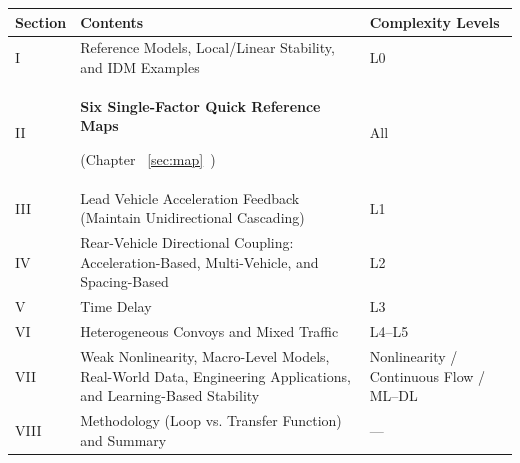 \documentclass[11pt,a4paper,openany]{book}
\numberwithin{equation}{chapter}
\numberwithin{figure}{chapter}
\numberwithin{table}{chapter}
\begin{document}
\begin{center}
\small
{}
\label{tab:book-roadmap}
\begin{tabular}{p{2.0cm}p{5.2cm}p{6.6cm}}
\toprule
\textbf{Section} & \textbf{Contents} & \textbf{Complexity Levels} \\
\midrule
I &




Reference Models, Local/Linear Stability, and IDM Examples




& L0 \\
II & \textbf{Six Single-Factor Quick Reference Maps}




(Chapter ~\ref{sec:map}~)& All



\\
III &




Lead Vehicle Acceleration Feedback (Maintain Unidirectional Cascading)




& L1 \\
IV &




 Rear-Vehicle Directional Coupling: Acceleration-Based, Multi-Vehicle, and Spacing-Based




& L2 \\
V &




Time Delay




& L3 \\
VI &




Heterogeneous Convoys and Mixed Traffic




& L4--L5 \\
VII &




 Weak Nonlinearity, Macro-Level Models, Real-World Data, Engineering Applications, and Learning-Based Stability




&




 Nonlinearity / Continuous Flow / ML–DL



\\
VIII &




 Methodology (Loop vs. Transfer Function) and Summary




& — \\
\bottomrule
\end{tabular}
\end{center}
\end{document}
